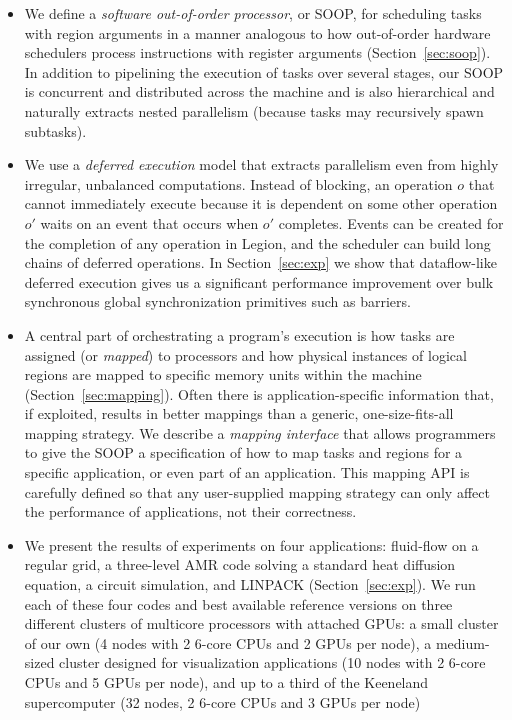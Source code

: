 \documentclass[conference]{IEEEtran}
\begin{document}
\begin{itemize}

\item We define a {\em software out-of-order processor}, or SOOP, for
  scheduling tasks with region arguments in a manner analogous to how
  out-of-order hardware schedulers process instructions with register
  arguments (Section~\ref{sec:soop}).  In addition to pipelining the execution of tasks over
  several stages, our SOOP is concurrent and distributed across the machine and is
  also hierarchical and naturally extracts nested
  parallelism (because tasks may recursively spawn subtasks).


\item We use a {\em deferred execution} model that extracts parallelism
even from highly irregular, unbalanced computations.  Instead of blocking,
an operation $o$ that cannot immediately execute because it is dependent
on some other operation $o'$ waits on an event that occurs when $o'$ completes.
Events can be created for the completion of any operation in Legion, and 
the scheduler can build long chains of deferred operations.  In Section~\ref{sec:exp}
we show that dataflow-like deferred execution gives us a significant performance improvement
over bulk synchronous global synchronization primitives such as barriers.

\item A central part of orchestrating a program's execution is how
tasks are assigned (or {\em mapped}) to processors and how physical instances of logical regions are
mapped to specific memory units within the machine  (Section~\ref{sec:mapping}).  Often there is
application-specific information that, if exploited, results in better
mappings than a generic, one-size-fits-all mapping strategy.  We describe
a {\em mapping interface} that allows programmers to give the SOOP a specification
of how to map tasks and regions for a specific application, or even part of an
application.  This mapping API is carefully defined so that
any user-supplied mapping strategy can only affect the performance of applications,
not their correctness.  


\item We present the results of experiments on four applications:
  fluid-flow on a regular grid, a three-level AMR code solving a
  standard heat diffusion equation, a circuit simulation, and LINPACK (Section~\ref{sec:exp}).
  We run each of these four codes and best available reference
  versions on three different clusters of multicore processors with
  attached GPUs: a small cluster of our own (4 nodes with 2 6-core CPUs and 2 GPUs per node), a medium-sized cluster
  designed for visualization applications (10 nodes with 2 6-core CPUs and 5 GPUs per node), and up to a third of the
  Keeneland supercomputer (32 nodes, 2 6-core CPUs and 3 GPUs per node)


\end{itemize}










%




\end{document}
